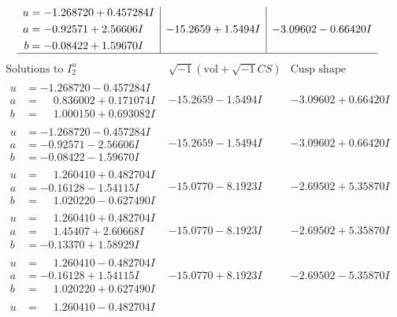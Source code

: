 \documentclass[1p]{elsarticle_modified}
\theoremstyle{definition}
\newcommand{\I}{\sqrt{-1}}
\begin{document}
$$\begin{array}{c|c|c}
\begin{aligned}
u &= -1.268720 + 0.457284 I \\
a &= -0.92571 + 2.56606 I \\
b &= -0.08422 + 1.59670 I\end{aligned}
 & -15.2659 + 1.5494 I & -3.09602 - 0.66420 I\\
 \hline 
 \end{array}$$\newpage$$\begin{array}{c|c|c}  
\text{Solutions to }I^u_{2}& \I (\text{vol} + \sqrt{-1}CS) & \text{Cusp shape}\\
 \hline 
\begin{aligned}
u &= -1.268720 - 0.457284 I \\
a &= \phantom{-}0.836002 + 0.171074 I \\
b &= \phantom{-}1.000150 + 0.693082 I\end{aligned}
 & -15.2659 - 1.5494 I & -3.09602 + 0.66420 I \\ \hline\begin{aligned}
u &= -1.268720 - 0.457284 I \\
a &= -0.92571 - 2.56606 I \\
b &= -0.08422 - 1.59670 I\end{aligned}
 & -15.2659 - 1.5494 I & -3.09602 + 0.66420 I \\ \hline\begin{aligned}
u &= \phantom{-}1.260410 + 0.482704 I \\
a &= -0.16128 - 1.54115 I \\
b &= \phantom{-}1.020220 - 0.627490 I\end{aligned}
 & -15.0770 - 8.1923 I & -2.69502 + 5.35870 I \\ \hline\begin{aligned}
u &= \phantom{-}1.260410 + 0.482704 I \\
a &= \phantom{-}1.45407 + 2.60668 I \\
b &= -0.13370 + 1.58929 I\end{aligned}
 & -15.0770 - 8.1923 I & -2.69502 + 5.35870 I \\ \hline\begin{aligned}
u &= \phantom{-}1.260410 - 0.482704 I \\
a &= -0.16128 + 1.54115 I \\
b &= \phantom{-}1.020220 + 0.627490 I\end{aligned}
 & -15.0770 + 8.1923 I & -2.69502 - 5.35870 I \\ \hline\begin{aligned}
u &= \phantom{-}1.260410 - 0.482704 I \\

\end{aligned}
\end{array}$$
\end{document}
